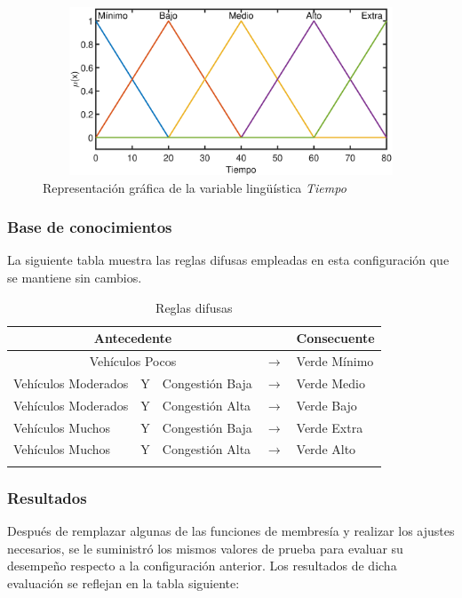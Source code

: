 \begin{figure}[H]
	\centering
	\includegraphics[height=5cm, width=12cm]{Variables/ConfigD_output1.eps}
	\caption[Representación gráfica de la variable lingüística \textit{Tiempo} (configuración \textit{D})]{Representación gráfica de la variable lingüística \textit{Tiempo}}
\end{figure}

\subsubsection{Base de conocimientos}
La siguiente tabla muestra las reglas difusas empleadas en esta configuración que se mantiene sin cambios.
\begin{longtable}[c]{lclcl} \toprule
	\multicolumn{3}{c}{Antecedente} & & Consecuente \\ \midrule
	\multicolumn{3}{c}{Vehículos Pocos} & $\rightarrow$ & Verde Mínimo \\
	Vehículos Moderados & Y & Congestión Baja& $\rightarrow$ & Verde Medio \\
	Vehículos Moderados & Y & Congestión Alta& $\rightarrow$ & Verde Bajo \\
	Vehículos Muchos &Y& Congestión Baja& $\rightarrow$ & Verde Extra \\
	Vehículos Muchos &Y& Congestión Alta& $\rightarrow$ & Verde Alto \\ \hline
	\caption[Reglas difusas (configuración \textit{D})]{Reglas difusas}
\end{longtable}

\pagebreak
\subsubsection{Resultados}
Después de remplazar algunas de las funciones de membresía y realizar los ajustes necesarios, se le suministró los mismos valores de prueba para evaluar su desempeño respecto a la configuración anterior. Los resultados de dicha evaluación se reflejan en la tabla siguiente:

